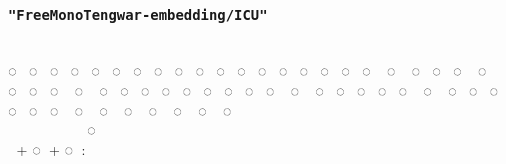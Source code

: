 \documentclass[11pt,a4paper]{article}
\begin{document}
\subsubsection*{\texttt{"FreeMonoTengwar-embedding/ICU"}}

\embedICU
                          \\
◌ ◌ ◌ ◌ ◌ ◌ ◌ ◌ ◌ ◌ ◌ ◌ ◌ ◌ ◌ ◌ ◌ ◌ ◌ ◌ ◌ ◌ ◌ ◌ ◌ ◌ ◌ ◌ ◌ ◌ ◌ ◌ ◌ ◌ ◌ ◌ ◌ ◌ ◌ ◌ ◌ ◌ ◌ ◌ ◌ ◌ ◌ ◌ ◌ ◌ ◌ ◌ ◌ ◌ ◌ ◌\\
      ◌‍ ‍ ‍ ‍ \\
 \normalfont + \embedICU ◌ \normalfont + \embedICU ◌ : 
\end{document}
